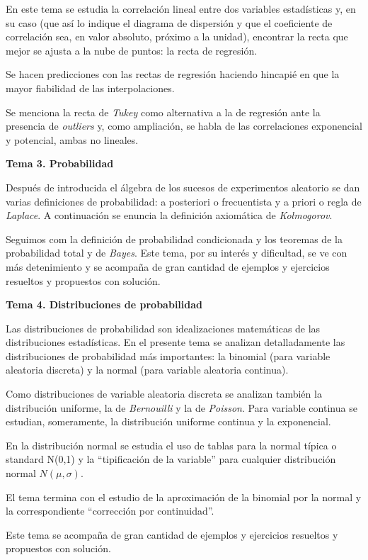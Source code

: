 \begin{adjustwidth}{50pt}{25pt}
En este tema se estudia la correlación lineal entre dos variables estadísticas y, en su caso (que así lo indique el diagrama de dispersión y que el coeficiente de correlación sea, en valor absoluto, próximo a la unidad), encontrar la recta que mejor se ajusta a la nube de puntos: la recta de regresión.

Se hacen predicciones con las rectas de regresión haciendo hincapié en que la mayor fiabilidad de las interpolaciones.

Se menciona la recta de \emph{Tukey} como alternativa a la de regresión ante la presencia de \emph{outliers} y, como ampliación, se habla de las correlaciones exponencial y potencial, ambas no lineales.
\end{adjustwidth}

\textbf{Tema 3. Probabilidad}

\begin{adjustwidth}{50pt}{25pt}
Después de introducida el álgebra de los sucesos de experimentos aleatorio se dan varias definiciones de probabilidad: a posteriori o frecuentista y a priori o regla de \emph{Laplace}. A continuación se enuncia la definición axiomática de \emph{Kolmogorov}.

Seguimos com la definición de probabilidad condicionada y los teoremas de la probabilidad total y de \emph{Bayes}. Este tema, por su interés y dificultad, se ve con más detenimiento y se acompaña de gran cantidad de ejemplos y ejercicios resueltos y propuestos con solución.
\end{adjustwidth}

\textbf{Tema 4. Distribuciones de probabilidad}

\begin{adjustwidth}{50pt}{25pt}
Las distribuciones de probabilidad son idealizaciones matemáticas de las distribuciones estadísticas. En el presente tema se analizan detalladamente las distribuciones de probabilidad más importantes: la binomial (para variable aleatoria discreta) y la normal (para variable aleatoria continua).

Como distribuciones de variable aleatoria discreta se analizan también la distribución uniforme, la de \emph{Bernouilli} y la de \emph{Poisson}. Para variable continua se estudian, someramente, la distribución uniforme continua y la exponencial.

En la distribución normal se estudia el uso de tablas para la normal típica o standard N(0,1) y la ``tipificación de la variable'' para cualquier distribución normal $N(\mu,\sigma)$.

El tema termina con el estudio de la aproximación de la binomial por la normal y la correspondiente ``corrección por continuidad''.

Este tema se acompaña de gran cantidad de ejemplos y ejercicios resueltos y propuestos con solución.

\end{adjustwidth}


